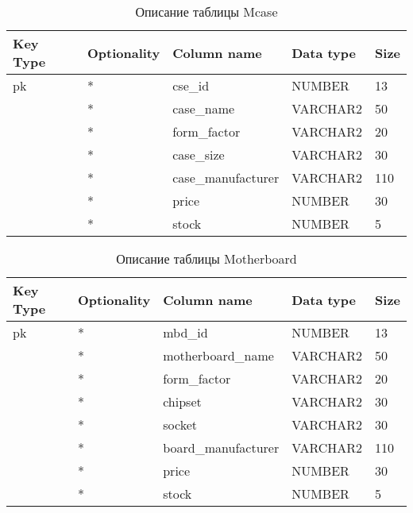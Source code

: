 \begin{xltabular}{\textwidth}{|X|X|p{4.0cm}|X|X|}
	\caption{Описание таблицы Mcase\label{tab:case}}\\
	\hline
	Key Type & Optionality & Column name & Data type & Size \\ \hline
	pk & * & cse\_id & NUMBER & 13 \\ \hline
	& * & case\_name & VARCHAR2 & 50 \\ \hline
	& * & form\_factor & VARCHAR2 & 20 \\ \hline
	& * & case\_size & VARCHAR2 & 30 \\ \hline
	& * & case\_manufacturer & VARCHAR2 & 110 \\ \hline
	& * & price & NUMBER & 30 \\ \hline
	& * & stock & NUMBER & 5 \\ \hline
\end{xltabular}

\begin{xltabular}{\textwidth}{|X|X|p{4.0cm}|X|X|}
	\caption{Описание таблицы Motherboard\label{tab:motherboard}}\\
	\hline
	Key Type & Optionality & Column name & Data type & Size \\ \hline
	pk & * & mbd\_id & NUMBER & 13 \\ \hline
	& * & motherboard\_name & VARCHAR2 & 50 \\ \hline
	& * & form\_factor & VARCHAR2 & 20 \\ \hline
	& * & chipset & VARCHAR2 & 30 \\ \hline
	& * & socket & VARCHAR2 & 30 \\ \hline
	& * & board\_manufacturer & VARCHAR2 & 110 \\ \hline
	& * & price & NUMBER & 30 \\ \hline
	& * & stock & NUMBER & 5 \\ \hline
\end{xltabular}

